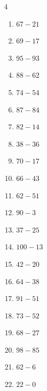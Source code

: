\begin{multicols}{4}
\begin{enumerate}
\columnbreak %

  \item $67-21$
        \phantom{$=46$}

  \item $69-17$
        \phantom{$=52$}

  \item $95-93$
        \phantom{$=2$}

  \item $88-62$
        \phantom{$=26$}

  \item $74-54$
        \phantom{$=20$}

  \item $87-84$
        \phantom{$=3$}

  \item $82-14$
        \phantom{$=68$}

  \item $38-36$
        \phantom{$=2$}

  \item $70-17$
        \phantom{$=53$}

  \item $66-43$
        \phantom{$=23$}

  \item $62-51$
        \phantom{$=11$}

  \item $90-3$
        \phantom{$=87$}

  \item $37-25$
        \phantom{$=12$}

  \item $100-13$
        \phantom{$=87$}

  \item $42-20$
        \phantom{$=22$}

  \item $64-38$
        \phantom{$=26$}

  \item $91-51$
        \phantom{$=40$}

  \item $73-52$
        \phantom{$=21$}

  \item $68-27$
        \phantom{$=41$}

  \item $98-85$
        \phantom{$=13$}

  \item $62-6$
        \phantom{$=56$}

  \item $22-0$
        \phantom{$=22$}


\end{enumerate}
\end{multicols}
